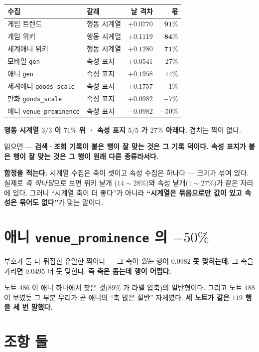 \documentclass[11pt]{article}
\begin{document}
\begin{center}
\begin{tabular}{llrr}
\hline
수집 & 갈래 & 날 격차 & 몫 \\
\hline
게임 트렌드 & 행동 시계열 & $+0.0770$ & $\mathbf{91\%}$ \\
게임 위키 & 행동 시계열 & $+0.1119$ & $\mathbf{84\%}$ \\
세계애니 위키 & 행동 시계열 & $+0.1280$ & $\mathbf{71\%}$ \\
\hline
모바일 \texttt{gen} & 속성 표지 & $+0.0541$ & $27\%$ \\
애니 \texttt{gen} & 속성 표지 & $+0.1958$ & $14\%$ \\
세계애니 \texttt{goods\_scale} & 속성 표지 & $+0.1757$ & $1\%$ \\
만화 \texttt{goods\_scale} & 속성 표지 & $+0.0982$ & $-7\%$ \\
애니 \texttt{venue\_prominence} & 속성 표지 & $-0.0982$ & $-50\%$ \\
\hline
\end{tabular}
\end{center}

\textbf{행동 시계열 $3/3$ 이 $71\%$ 위 · 속성 표지 $5/5$ 가 $27\%$
아래다.} 겹치는 짝이 없다.

읽으면 --- \textbf{검색·조회 기록이 붙은 행이 잘 맞는 것은 그 기록
덕이다. 속성 표지가 붙은 행이 잘 맞는 것은 그 행이 원래 다른 종류라서다.}

\textbf{함정을 적는다.} 시계열 수집은 축이 셋이고 속성 수집은 하나다 ---
크기가 섞여 있다. 실제로 \emph{축 하나당}으로 보면 위키 낱개
($14 \sim 28\%$)와 속성 낱개($1 \sim 27\%$)가 같은 자리에 있다. 그러니
``시계열 축이 더 좋다''가 아니라 \textbf{``시계열은 묶음으로만 값이
있고 속성은 묶어도 없다''}가 맞는 말이다.

\section{애니 \texttt{venue\_prominence} 의 $-50\%$}

부호가 둘 다 뒤집힌 유일한 짝이다 --- 그 축이 \emph{있는} 행이 $0.0982$
\textbf{못 맞히는데}, 그 축을 가리면 $0.0495$ 더 못 맞힌다. 즉
\textbf{축은 돕는데 행이 어렵다.}

노트 486 이 애니 하나에서 찾은 것($89\%$ 가 라벨 압축)의 일반형이다.
그리고 노트 488 이 보였듯 그 부분 무리가 곧 애니의 ``축 많은 절반''
자체였다. \textbf{세 노트가 같은 $119$ 행을 세 번 말했다.}

\section*{조항 둘}
\end{document}
